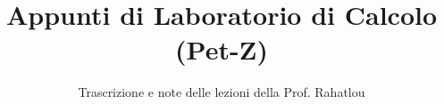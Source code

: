 \documentclass[a4paper,12pt]{article}
\title{Appunti di Laboratorio di Calcolo (Pet-Z)}
\author{Trascrizione e note delle lezioni della Prof. Rahatlou}
\date{}
\begin{document}
\maketitle
\projectintro
\tableofcontents
\newpage

\end{document}
